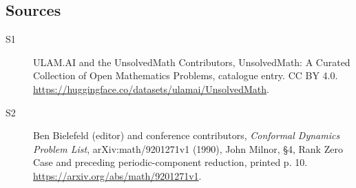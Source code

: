 \documentclass[11pt]{article}
\begin{document}
\subsection{Sources}
\begin{description}
\item[\hypertarget{source:statement:1}{S1}] ULAM.AI and the UnsolvedMath Contributors, UnsolvedMath: A Curated Collection of Open Mathematics Problems, catalogue entry. CC BY 4.0. \url{https://huggingface.co/datasets/ulamai/UnsolvedMath}.
\item[\hypertarget{source:statement:2}{S2}] Ben Bielefeld (editor) and conference contributors, \emph{Conformal Dynamics Problem List}, arXiv:math/9201271v1 (1990), John Milnor, \S4, Rank Zero Case and preceding periodic-component reduction, printed p. 10. \url{https://arxiv.org/abs/math/9201271v1}.
\end{description}
\label{end:statement}
\end{document}
